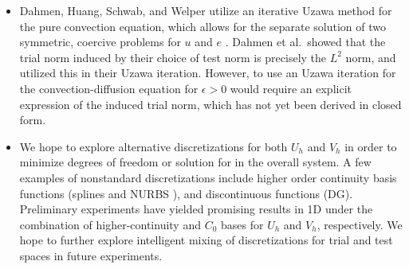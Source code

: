\documentclass[final,leqno]{siamltex}
\newcommand{\bs}[1]{\boldsymbol{#1}}
\begin{document}
\begin{itemize}
\item Dahmen, Huang, Schwab, and Welper utilize an iterative Uzawa method for the pure convection equation, which allows for the separate solution of two symmetric, coercive problems for $u$ and $e$ \cite{dahmenConvection}.  Dahmen et al.\ showed that the trial norm induced by their choice of test norm is precisely the $L^2$ norm, and utilized this in their Uzawa iteration.  However, to use an Uzawa iteration for the convection-diffusion equation for $\epsilon > 0$ would require an explicit expression of the induced trial norm, which has not yet been derived in closed form.  
\item We hope to explore alternative discretizations for both $U_h$ and $V_h$ in order to minimize degrees of freedom or solution for in the overall system.  A few examples of nonstandard discretizations include higher order continuity basis functions (splines and NURBS \cite{NURBSorig}), and discontinuous functions (DG).  Preliminary experiments have yielded promising results in 1D under the combination of higher-continuity and $C_0$ bases for $U_h$ and $V_h$, respectively.  We hope to further explore intelligent mixing of discretizations for trial and test spaces in future experiments.  

\end{itemize}
\end{document}
